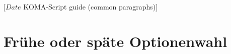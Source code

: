 %
%
%
%
%
%
%
%
% 
%
%
%
%

                 [$Date$
                  KOMA-Script guide (common paragraphs)]

\section{Frühe oder späte Optionenwahl}
\BeginIndexGroup
{}%

